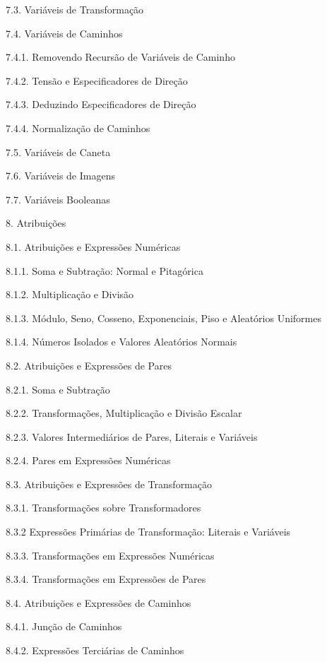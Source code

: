 7.3. Variáveis de Transformação 

7.4. Variáveis de Caminhos 

7.4.1. Removendo Recursão de Variáveis de Caminho 

7.4.2. Tensão e Especificadores de Direção 

7.4.3. Deduzindo Especificadores de Direção 

7.4.4. Normalização de Caminhos 

7.5. Variáveis de Caneta 

7.6. Variáveis de Imagens 

7.7. Variáveis Booleanas 

8. Atribuições 

8.1. Atribuições e Expressões Numéricas 

8.1.1. Soma e Subtração: Normal e Pitagórica 

8.1.2. Multiplicação e Divisão 

8.1.3. Módulo, Seno, Cosseno, Exponenciais, Piso e Aleatórios Uniformes 

8.1.4. Números Isolados e Valores Aleatórios Normais 

8.2. Atribuições e Expressões de Pares 

8.2.1. Soma e Subtração 

8.2.2. Transformações, Multiplicação e Divisão Escalar 

8.2.3. Valores Intermediários de Pares, Literais e Variáveis 

8.2.4. Pares em Expressões Numéricas 

8.3. Atribuições e Expressões de Transformação 

8.3.1. Transformações sobre Transformadores 

8.3.2 Expressões Primárias de Transformação: Literais e Variáveis 

8.3.3. Transformações em Expressões Numéricas 

8.3.4. Transformações em Expressões de Pares 

8.4. Atribuições e Expressões de Caminhos 

8.4.1. Junção de Caminhos 

8.4.2. Expressões Terciárias de Caminhos 

